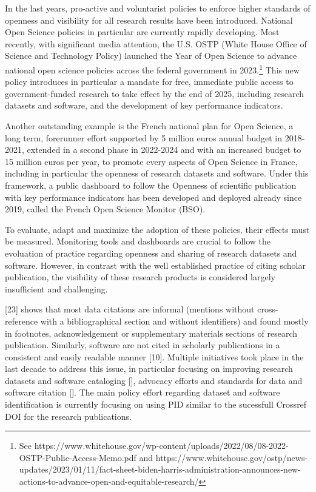 \documentclass[
]{article}
\begin{document}
In the last years, pro-active and voluntarist policies to enforce higher
standards of openness and visibility for all research results have been
introduced. National Open Science policies in particular are currently
rapidly developing. Most recently, with significant media attention, the
U.S. OSTP (White House Office of Science and Technology Policy) launched
the Year of Open Science to advance national open science policies
across the federal government in 2023.\footnote{See
  https://www.whitehouse.gov/wp-content/uploads/2022/08/08-2022-OSTP-Public-Access-Memo.pdf
  and
  https://www.whitehouse.gov/ostp/news-updates/2023/01/11/fact-sheet-biden-harris-administration-announces-new-actions-to-advance-open-and-equitable-research/}
This new policy introduces in particular a mandate for free, immediate
public access to government-funded research to take effect by the end of
2025, including research datasets and software, and the development of
key performance indicators.

Another outstanding example is the French national plan for Open
Science, a long term, forerunner effort supported by 5 million euros
annual budget in 2018-2021, extended in a second phase in 2022-2024 and
with an increased budget to 15 million euros per year, to promote every
aspects of Open Science in France, including in particular the openness
of research datasets and software. Under this framework, a public
dashboard to follow the Openness of scientific publication with key
performance indicators has been developed and deployed already since
2019, called the French Open Science Monitor (BSO).

To evaluate, adapt and maximize the adoption of these policies, their
effects must be measured. Monitoring tools and dashboards are crucial to
follow the evoluation of practice regarding openness and sharing of
research datasets and software. However, in contrast with the well
established practice of citing scholar publication, the visibility of
these research products is considered largely insufficient and
challenging.

{[}23{]} shows that most data citations are informal (mentions without
cross-reference with a bibliographical section and without identifiers)
and found mostly in footnotes, acknowledgement or supplementary
materials sections of research publication. Similarly, software are not
cited in scholarly publications in a consistent and easily readable
manner {[}10{]}. Multiple initiatives took place in the last decade to
address this issue, in particular focusing on improving research
datasets and software cataloging {[}{]}, advocacy efforts and standards
for data and software citation {[}{]}. The main policy effort regarding
dataset and software identification is currently focusing on using PID
similar to the sucessfull Crossref DOI for the research publications.
\end{document}
